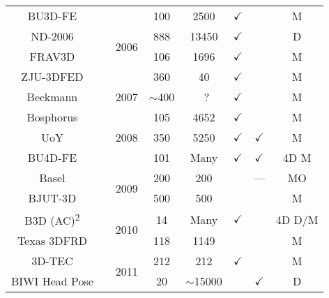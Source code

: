 \begin{table}[]
{\begin{tabular}{@{}cccccccc@{}}
BU3D-FE                     &\cite{Yin:2006cc}              & \multirow{4}{*}{2006} & 100         & 2500        & $\checkmark$ &              & M      \\
ND-2006                     &\cite{faltemier2007using}      &                       & 888         & 13450       & $\checkmark$ &              & D      \\
FRAV3D                      &\cite{conde2006multimodal}     &                       & 106         & 1696        & $\checkmark$ &              & M      \\
ZJU-3DFED                   &\cite{wang2006exploring}       &                       & 360         & 40          & $\checkmark$ &              & M      \\ \midrule
Beckmann                    &\cite{hu2007building}          & 2007                  & $\sim$400   &~?           & $\checkmark$ &              & M      \\ \midrule
Bosphorus                   &\cite{Savran:2008gg}           & \multirow{3}{*}{2008} & 105         & 4652        & $\checkmark$ &              & M      \\
UoY                         &\cite{heseltine2008three}      &                       & 350         & 5250        & $\checkmark$ & $\checkmark$ & M      \\
BU4D-FE                     &\cite{yin2008high}             &                       & 101         & Many        & $\checkmark$ & $\checkmark$ & 4D M   \\ \midrule
Basel                       &\cite{paysan20093d}            & \multirow{2}{*}{2009} & 200         & 200         &              & ---          & MO     \\
BJUT-3D                     &\cite{baocai2009bjut}          &                       & 500         & 500         &              &              & M      \\ \midrule
B3D (AC)\textsuperscript{2} &\cite{fanelli20103}            & \multirow{2}{*}{2010} & 14          & Many        & $\checkmark$ &              & 4D D/M \\
Texas 3DFRD                 &\cite{gupta2010anthropometric} &                       & 118         & 1149        &              &              & M      \\ \midrule
3D-TEC                      &\cite{vijayan2011twins}        & \multirow{3}{*}{2011} & 212         & 212         & $\checkmark$ &              & M      \\
BIWI Head Pose              &\cite{fanelli2013random}       &                       & 20          & $\sim$15000 &              & $\checkmark$ & D      \\

\end{tabular}}
\end{table}
